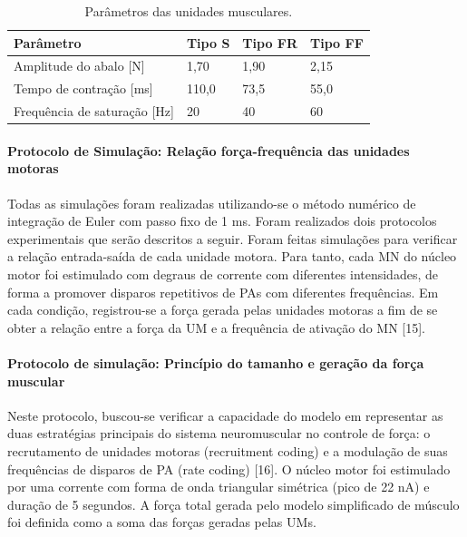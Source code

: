 
\begin{table}[h]
 \caption{Parâmetros das unidades musculares.}
  \centering
  \begin{tabular}{llll}
    \toprule
    Parâmetro     & Tipo S     & Tipo FR     & Tipo FF   \\
    \midrule
    Amplitude do abalo [N] & 1,70 & 1,90 & 2,15 \\
    Tempo de contração [ms] & 110,0 & 73,5 & 55,0 \\
    Frequência de saturação [Hz] & 20 & 40 & 60 \\
    \bottomrule
  \end{tabular}
  \label{tab:table}
\end{table}

\paragraph{Protocolo de Simulação: Relação força-frequência das unidades motoras}
Todas as simulações foram realizadas utilizando-se o método numérico de integração de Euler com passo fixo de 1 ms. Foram realizados dois protocolos experimentais que serão descritos a seguir. Foram feitas simulações para verificar a relação entrada-saída de cada unidade motora. Para tanto, cada MN do núcleo motor foi estimulado com degraus de corrente com diferentes intensidades, de forma a promover disparos repetitivos de PAs com diferentes frequências. Em cada condição, registrou-se a força gerada pelas unidades motoras a fim de se obter a relação entre a força da UM e a frequência de ativação do MN [15].

\paragraph{Protocolo de simulação: Princípio do tamanho e geração da força muscular}
Neste protocolo, buscou-se verificar a capacidade do modelo em representar as duas estratégias principais do sistema neuromuscular no controle de força: o recrutamento de unidades motoras (recruitment coding) e a modulação de suas frequências de disparos de PA (rate coding) [16]. O núcleo motor foi estimulado por uma corrente com forma de onda triangular simétrica (pico de 22 nA) e duração de 5 segundos. A força total gerada pelo modelo simplificado de músculo foi definida como a soma das forças geradas pelas UMs.